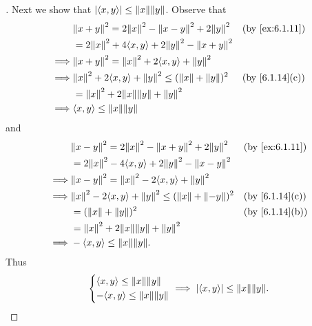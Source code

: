 \begin{proof}[]
  Next we show that \(\abs{\inn{x, y}} \leq \norm{x} \norm{y}\).
  Observe that
  \begin{align*}
             & \norm{x + y}^2 = 2 \norm{x}^2 - \norm{x - y}^2 + 2 \norm{y}^2       &  & \text{(by \cref{ex:6.1.11})} \\
             & = 2 \norm{x}^2 + 4 \inn{x, y} + 2 \norm{y}^2 - \norm{x + y}^2                                         \\
    \implies & \norm{x + y}^2 = \norm{x}^2 + 2 \inn{x, y} + \norm{y}^2                                               \\
    \implies & \norm{x}^2 + 2 \inn{x, y} + \norm{y}^2 \leq (\norm{x} + \norm{y})^2 &  & \text{(by \cref{6.1.14}(c))} \\
             & = \norm{x}^2 + 2 \norm{x} \norm{y} + \norm{y}^2                                                       \\
    \implies & \inn{x, y} \leq \norm{x} \norm{y}
  \end{align*}
  and
  \begin{align*}
             & \norm{x - y}^2 = 2 \norm{x}^2 - \norm{x + y}^2 + 2 \norm{y}^2        &  & \text{(by \cref{ex:6.1.11})} \\
             & = 2 \norm{x}^2 - 4 \inn{x, y} + 2 \norm{y}^2 - \norm{x - y}^2                                          \\
    \implies & \norm{x - y}^2 = \norm{x}^2 - 2 \inn{x, y} + \norm{y}^2                                                \\
    \implies & \norm{x}^2 - 2 \inn{x, y} + \norm{y}^2 \leq (\norm{x} + \norm{-y})^2 &  & \text{(by \cref{6.1.14}(c))} \\
             & = (\norm{x} + \norm{y})^2                                            &  & \text{(by \cref{6.1.14}(b))} \\
             & = \norm{x}^2 + 2 \norm{x} \norm{y} + \norm{y}^2                                                        \\
    \implies & - \inn{x, y} \leq \norm{x} \norm{y}.
  \end{align*}
  Thus
  \[
    \begin{dcases}
      \inn{x, y} \leq \norm{x} \norm{y} \\
      -\inn{x, y} \leq \norm{x} \norm{y}
    \end{dcases} \implies \abs{\inn{x, y}} \leq \norm{x} \norm{y}.
  \]


\end{proof}
